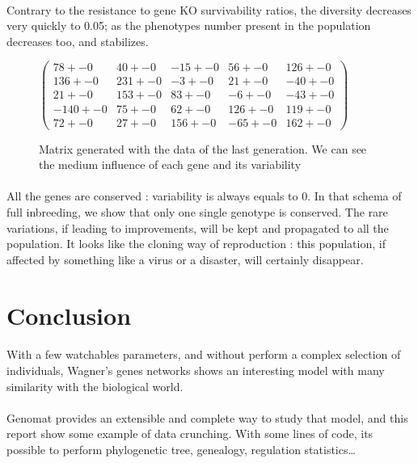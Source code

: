 \documentclass[]{report} %
\begin{document}
    \paragraph*{}
    Contrary to the resistance to gene KO survivability ratios, the diversity decreases very quickly to 0.05; as the phenotypes number present in the population decreases too, and stabilizes.
   

    \begin{figure}[H] 
            \centering
            \small
    $
          \begin{pmatrix}
                78 +- 0 & 40 +- 0 & -15 +- 0 & 56 +- 0 & 126 +- 0 \\
                136 +- 0 & 231 +- 0 & -3 +- 0 & 21 +- 0 & -40 +- 0 \\
                21 +- 0 & 153 +- 0 & 83 +- 0 & -6 +- 0 & -43 +- 0 \\
                -140 +- 0 & 75 +- 0 & 62 +- 0 & 126 +- 0 & 119 +- 0 \\
                72 +- 0 & 27 +- 0 & 156 +- 0 & -65 +- 0 & 162 +- 0 
           \end{pmatrix}
    $
            \caption{\footnotesize Matrix generated with the data of the last generation. We can see the medium influence of each gene and its variability}
            \label{mat:ps20xg200xprt20xmr1-10-4}
    \end{figure}
    \paragraph*{}
    All the genes are conserved : variability is always equals to 0. 
    In that schema of full inbreeding, we show that only one single genotype is conserved. The rare variations, if leading to improvements, will be kept and propagated to all the population.
    It looks like the cloning way of reproduction : this population, if affected by something like a virus or a disaster, will certainly disappear.


\section{Conclusion}
    \paragraph*{}
    With a few watchables parameters, and without perform a complex selection of individuals, 
    Wagner's genes networks shows an interesting model with many similarity with the biological world.
    \paragraph*{}
    Genomat provides an extensible and complete way to study that model, and this report show some example of data crunching.
    With some lines of code, its possible to perform phylogenetic tree, genealogy, regulation statistics…
\end{document}
